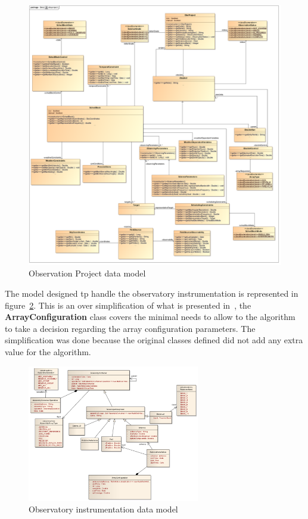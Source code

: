 \begin{figure}[htbp]	
\begin{center}
\includegraphics[width=1.15\textwidth]{images/Obsproject}
\end{center}
\caption{Observation Project data model}
\label{fig:datamodel-obsproject}
\end{figure}

The model designed tp handle the observatory instrumentation is represented in figure~\ref{fig:datamodel-observatory}. This is an over simplification of what is presented in~\cite{avarias11, hoffstadt10}, the \textbf{ArrayConfiguration} class covers the minimal needs to allow to the algorithm to take a decision regarding the array configuration parameters. The simplification was done because the original classes defined did not add any extra value for the algorithm.

\begin{figure}[htbp]	
\begin{center}
\includegraphics[width=0.67\textwidth]{images/Observatory}
\end{center}
\caption{Observatory instrumentation data model}
\label{fig:datamodel-observatory}
\end{figure}

